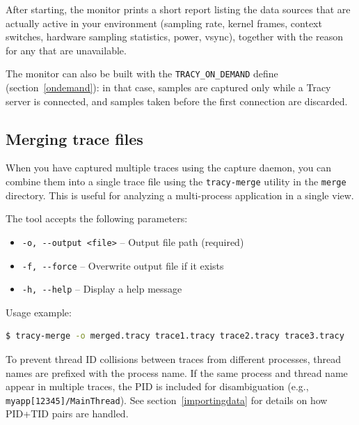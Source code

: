 \documentclass[hidelinks,titlepage,a4paper,twoside]{article}
\begin{document}
After starting, the monitor prints a short report listing the data sources that are actually active in your environment (sampling rate, kernel frames, context switches, hardware sampling statistics, power, vsync), together with the reason for any that are unavailable.

The monitor can also be built with the \texttt{TRACY\_ON\_DEMAND} define (section~\ref{ondemand}): in that case, samples are captured only while a Tracy server is connected, and samples taken before the first connection are discarded.

\subsection{Merging trace files}
\label{mergingtraces}

When you have captured multiple traces using the capture daemon, you can combine them into a single trace file using the \texttt{tracy-merge} utility in the \texttt{merge} directory. This is useful for analyzing a multi-process application in a single view.

The tool accepts the following parameters:

\begin{itemize}
  \item \texttt{-o, -{}-output <file>} -- Output file path (required)
  \item \texttt{-f, -{}-force} -- Overwrite output file if it exists
  \item \texttt{-h, -{}-help} -- Display a help message
\end{itemize}

Usage example:

\begin{lstlisting}[language=sh]
$ tracy-merge -o merged.tracy trace1.tracy trace2.tracy trace3.tracy
\end{lstlisting}

To prevent thread ID collisions between traces from different processes, thread names are prefixed with the process name. If the same process and thread name appear in multiple traces, the PID is included for disambiguation (e.g., \texttt{myapp[12345]/MainThread}). See section~\ref{importingdata} for details on how PID+TID pairs are handled.
\end{document}
